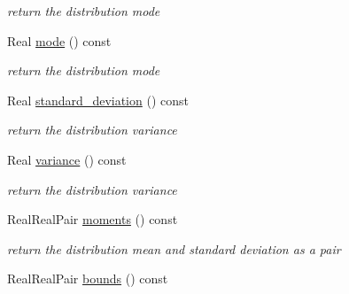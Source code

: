 \begin{DoxyCompactItemize}
\begin{DoxyCompactList}\small\item\em return the distribution mode \end{DoxyCompactList}\item 
Real \hyperlink{classPecos_1_1BoundedLognormalRandomVariable_a72d3d6926edd929cb3f8e12baa655f70}{mode} () const \label{classPecos_1_1BoundedLognormalRandomVariable_a72d3d6926edd929cb3f8e12baa655f70}

\begin{DoxyCompactList}\small\item\em return the distribution mode \end{DoxyCompactList}\item 
Real \hyperlink{classPecos_1_1BoundedLognormalRandomVariable_a6a4ed9624d511f8a4e4f509c82cb0706}{standard\+\_\+deviation} () const \label{classPecos_1_1BoundedLognormalRandomVariable_a6a4ed9624d511f8a4e4f509c82cb0706}

\begin{DoxyCompactList}\small\item\em return the distribution variance \end{DoxyCompactList}\item 
Real \hyperlink{classPecos_1_1BoundedLognormalRandomVariable_a4b8b05b2a9af92dad9cc304c2925a4eb}{variance} () const \label{classPecos_1_1BoundedLognormalRandomVariable_a4b8b05b2a9af92dad9cc304c2925a4eb}

\begin{DoxyCompactList}\small\item\em return the distribution variance \end{DoxyCompactList}\item 
Real\+Real\+Pair \hyperlink{classPecos_1_1BoundedLognormalRandomVariable_a80e9024c98c6105a5eace8601a91b3d3}{moments} () const 
\begin{DoxyCompactList}\small\item\em return the distribution mean and standard deviation as a pair \end{DoxyCompactList}\item 
Real\+Real\+Pair \hyperlink{classPecos_1_1BoundedLognormalRandomVariable_a4bdb95a8fa5fffaa0de5102f56963cf2}{bounds} () const \label{classPecos_1_1BoundedLognormalRandomVariable_a4bdb95a8fa5fffaa0de5102f56963cf2}


\end{DoxyCompactItemize}
